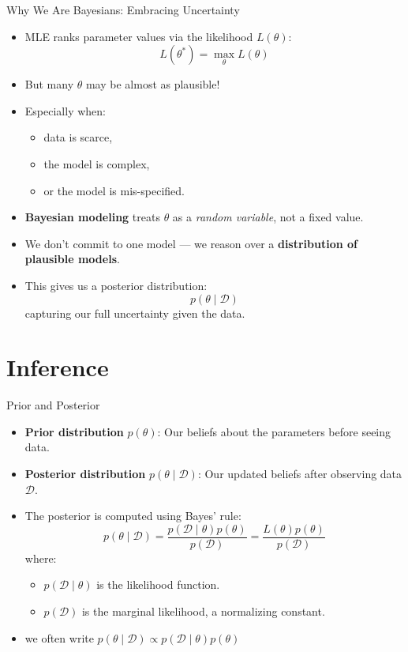 \documentclass{beamer}
\begin{document}
\begin{frame}{Why We Are Bayesians: Embracing Uncertainty}
  \begin{itemize}
    \item MLE ranks parameter values via the likelihood $L(\theta)$:
    \[
      L(\theta^*) = \max_\theta L(\theta)
    \]
    \item But many $\theta$ may be almost as plausible!
    \item Especially when:
    \begin{itemize}
      \item data is scarce,
      \item the model is complex,
      \item or the model is mis-specified.
    \end{itemize}
    \vspace{0.5em}
    \item \textbf{Bayesian modeling} treats $\theta$ as a \textit{random variable}, not a fixed value.
    \item We don’t commit to one model — we reason over a \textbf{distribution of plausible models}.
    \item This gives us a posterior distribution:
    \[
      p(\theta \mid \mathcal{D})
    \]
    capturing our full uncertainty given the data.
  \end{itemize}
\end{frame}

\section{Inference}

\begin{frame}{Prior and Posterior}
  \begin{itemize}
    \item \textbf{Prior distribution} $p(\theta)$: Our beliefs about the parameters before seeing data.
    \item \textbf{Posterior distribution} $p(\theta \mid \mathcal{D})$: Our updated beliefs after observing data $\mathcal{D}$.
    \item The posterior is computed using Bayes' rule:
    \[
      p(\theta \mid \mathcal{D}) = \frac{p(\mathcal{D} \mid \theta) p(\theta)}{p(\mathcal{D})} = \frac{L(\theta) p(\theta)}{p(\mathcal{D})}
    \]
    where:
    \begin{itemize}
      \item $p(\mathcal{D} \mid \theta)$ is the likelihood function.
      \item $p(\mathcal{D})$ is the marginal likelihood, a normalizing constant.
      \end{itemize}
    \item we often write $p(\theta \mid \mathcal{D}) \propto p(\mathcal{D} \mid \theta) p(\theta)$
  \end{itemize}
\end{frame}
\end{document}
